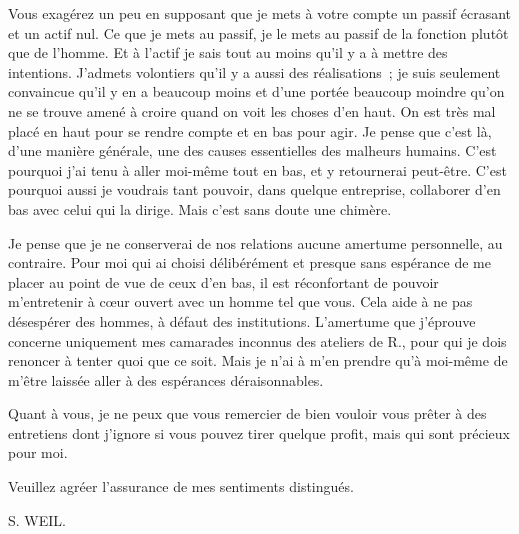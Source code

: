 \documentclass[french,twoside]{book} %
\begin{document}
Vous exagérez un peu en supposant que je mets à votre compte un passif écrasant et un actif nul. Ce que je mets au passif, je le mets au passif de la fonction plutôt que de l'homme. Et à l'actif je sais tout au moins qu'il y a à mettre des intentions. J'admets volontiers qu'il y a aussi des réalisations ; je suis seulement convaincue qu'il y en a beaucoup moins et d'une portée beaucoup moindre qu'on ne se trouve amené à croire quand on voit les choses d'en haut. On est très mal placé en haut pour se rendre compte et en bas pour agir. Je pense que c'est là, d'une manière générale, une des causes essentielles des malheurs humains. C'est pourquoi j'ai tenu à aller moi-même tout en bas, et y retournerai peut-être. C'est pourquoi aussi je voudrais tant pouvoir, dans quelque entreprise, collaborer d'en bas avec celui qui la dirige. Mais c'est sans doute une chimère.\par
Je pense que je ne conserverai de nos relations aucune amertume personnelle, au contraire. Pour moi qui ai choisi délibérément et presque sans espérance de me placer au point de vue de ceux d'en bas, il est réconfortant de pouvoir m'entretenir à cœur ouvert avec un homme tel que vous. Cela aide à ne pas désespérer des hommes, à défaut des institutions. L'amertume que j'éprouve concerne uniquement mes camarades inconnus des ateliers de R., pour qui je dois renoncer à tenter quoi que ce soit. Mais je n'ai à m'en prendre qu'à moi-même de m'être laissée aller à des espérances déraisonnables.\par
Quant à vous, je ne peux que vous remercier de bien vouloir vous prêter à des entretiens dont j'ignore si vous pouvez tirer quelque profit, mais qui sont précieux pour moi.\par
Veuillez agréer l'assurance de mes sentiments distingués.\par
S. WEIL.\par
\end{document}
